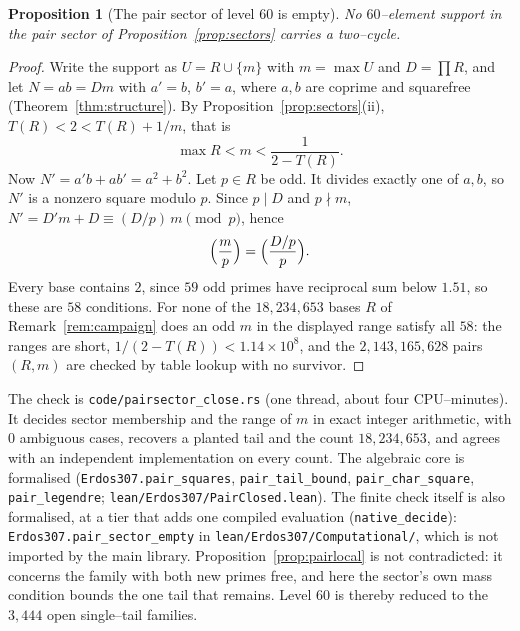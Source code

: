 \documentclass[11pt]{article}
\newtheorem{proposition}[theorem]{Proposition}
\theoremstyle{definition}
\begin{document}
\begin{proposition}[The pair sector of level $60$ is empty]\label{prop:pairclosed}
No $60$--element support in the pair sector of Proposition~\ref{prop:sectors} carries a two--cycle.
\end{proposition}
\begin{proof}
Write the support as $U=R\cup\{m\}$ with $m=\max U$ and $D=\prod R$, and let $N=ab=Dm$ with $a'=b$, $b'=a$, where $a,b$
are coprime and squarefree (Theorem~\ref{thm:structure}). By Proposition~\ref{prop:sectors}\textup{(ii)},
$T(R)<2<T(R)+1/m$, that is
\[ \max R<m<\frac{1}{2-T(R)}. \]
Now $N'=a'b+ab'=a^2+b^2$. Let $p\in R$ be odd. It divides exactly one of $a,b$, so $N'$ is a nonzero square modulo $p$.
Since $p\mid D$ and $p\nmid m$, $N'=D'm+D\equiv(D/p)\,m\pmod p$, hence
\[ \Bigl(\frac{m}{p}\Bigr)=\Bigl(\frac{D/p}{p}\Bigr). \]
Every base contains $2$, since $59$ odd primes have reciprocal sum below $1.51$, so these are $58$ conditions. For none
of the $18{,}234{,}653$ bases $R$ of Remark~\ref{rem:campaign} does an odd $m$ in the displayed range satisfy all $58$:
the ranges are short, $1/(2-T(R))<1.14\times10^{8}$, and the $2{,}143{,}165{,}628$ pairs $(R,m)$ are checked by table
lookup with no survivor.
\end{proof}

The check is \texttt{code/pairsector\_close.rs} (one thread, about four CPU--minutes). It decides sector membership and
the range of $m$ in exact integer arithmetic, with $0$ ambiguous cases, recovers a planted tail and the count
$18{,}234{,}653$, and agrees with an independent implementation on every count. The algebraic core is formalised
(\texttt{Erdos307.pair\_squares}, \texttt{pair\_tail\_bound}, \texttt{pair\_char\_square}, \texttt{pair\_legendre};
\texttt{lean/Erdos307/PairClosed.lean}). The finite check itself is also formalised, at a tier that adds one compiled evaluation (\texttt{native\_decide}): \texttt{Erdos307.pair\_sector\_empty} in \texttt{lean/Erdos307/Computational/}, which is not imported by the main library. Proposition~\ref{prop:pairlocal} is not contradicted: it concerns the family
with both new primes free, and here the sector's own mass condition bounds the one tail that remains. Level $60$ is
thereby reduced to the $3{,}444$ open single--tail families.
\end{document}
